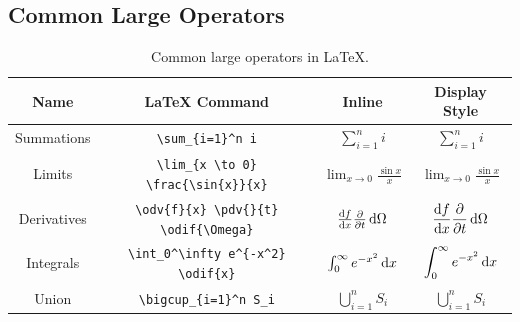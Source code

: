 \documentclass[11pt, twoside]{article}
\begin{document}
\subsection{Common Large Operators}
\begin{table}[H]
    \centering
    \begingroup
    \renewcommand{\arraystretch}{2.2}
    \begin{tabular}{c c c c}
        \toprule
        \textbf{Name} & \textbf{\LaTeX{} Command}                      & \textbf{Inline}                        & \textbf{Display Style}                               \\
        \midrule
        Summations    & \lstinline|\sum_{i=1}^n i|                     & \(\sum_{i=1}^n i\)                     & \(\displaystyle \sum_{i=1}^n i\)                     \\
        Limits        & \lstinline|\lim_{x \to 0} \frac{\sin{x}}{x}|   & \(\lim_{x \to 0} \frac{\sin{x}}{x}\)   & \(\displaystyle \lim_{x \to 0} \frac{\sin{x}}{x}\)   \\
        Derivatives   & \lstinline|\odv{f}{x} \pdv{}{t} \odif{\Omega}| & \(\odv{f}{x} \pdv{}{t} \odif{\Omega}\) & \(\displaystyle \odv{f}{x} \pdv{}{t} \odif{\Omega}\) \\
        Integrals     & \lstinline|\int_0^\infty e^{-x^2} \odif{x}|    & \(\int_0^\infty e^{-x^2} \odif{x}\)    & \(\displaystyle \int_0^\infty e^{-x^2} \odif{x}\)    \\
        Union         & \lstinline|\bigcup_{i=1}^n S_i|                & \(\bigcup_{i=1}^n S_i\)                & \(\displaystyle \bigcup_{i=1}^n S_i\)                \\
        \bottomrule
    \end{tabular}
    \endgroup
    \caption{Common large operators in \LaTeX{}.} %
\end{table}
\end{document}
